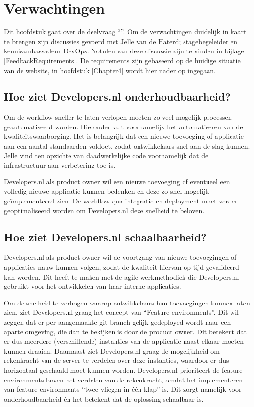 \chapter{Verwachtingen}

\label{Verwachtingen}

Dit hoofdstuk gaat over de deelvraag \enquote{\deelverwachtingen}. Om de verwachtingen duidelijk in kaart te brengen zijn discussies gevoerd met Jelle van de Haterd; stagebegeleider en kennisambassadeur DevOps. Notulen van deze discussie zijn te vinden in bijlage \ref{FeedbackRequirements}. De requirements zijn gebaseerd op de huidige situatie van de website, in hoofdstuk \ref{Chapter4} wordt hier nader op ingegaan.

\section{Hoe ziet Developers.nl onderhoudbaarheid?}

Om de workflow sneller te laten verlopen moeten zo veel mogelijk processen geautomatiseerd worden. Hieronder valt voornamelijk het automatiseren van de kwaliteitswaarborging. Het is belangrijk dat een nieuwe toevoeging of applicatie aan een aantal standaarden voldoet, zodat ontwikkelaars snel aan de slag kunnen. Jelle vind ten opzichte van daadwerkelijke code voornamelijk dat de infrastructuur aan verbetering toe is.

Developers.nl als product owner wil een nieuwe toevoeging of eventueel een volledig nieuwe applicatie kunnen bedenken en deze zo snel mogelijk geïmplementeerd zien. De workflow qua integratie en deployment moet verder geoptimaliseerd worden om Developers.nl deze snelheid te beloven.

\section{Hoe ziet Developers.nl schaalbaarheid?}

Developers.nl als product owner wil de voortgang van nieuwe toevoegingen of applicaties nauw kunnen volgen, zodat de kwaliteit hiervan op tijd gevalideerd kan worden. Dit heeft te maken met de agile werkmethodiek die Developers.nl gebruikt voor het ontwikkelen van haar interne applicaties.

Om de snelheid te verhogen waarop ontwikkelaars hun toevoegingen kunnen laten zien, ziet Developers.nl graag het concept van \enquote{Feature environments}. Dit wil zeggen dat er per aangemaakte git branch gelijk gedeployed wordt naar een aparte omgeving, die dan te bekijken is door de product owner. Dit betekent dat er dus meerdere (verschillende) instanties van de applicatie naast elkaar moeten kunnen draaien. Daarnaast ziet Developers.nl graag de mogelijkheid om rekenkracht van de server te verdelen over deze instanties, waardoor er dus horizontaal geschaald moet kunnen worden. Developers.nl prioriteert de feature environments boven het verdelen van de rekenkracht, omdat het implementeren van feature environments \enquote{twee vliegen in één klap} is. Dit zorgt namelijk voor onderhoudbaarheid én het betekent dat de oplossing schaalbaar is.


